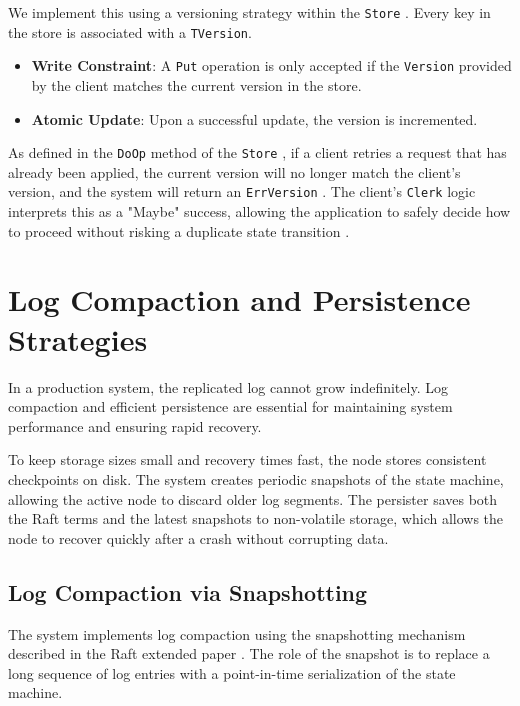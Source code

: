 We implement this using a versioning strategy within the \texttt{Store} \cite{store_go}. Every key in the store is associated with a \texttt{TVersion}.
\begin{itemize}
    \item \textbf{Write Constraint}: A \texttt{Put} operation is only accepted if the \texttt{Version} provided by the client matches the current version in the store.
    \item \textbf{Atomic Update}: Upon a successful update, the version is incremented.
\end{itemize}

As defined in the \texttt{DoOp} method of the \texttt{Store} \cite{store_go}, if a client retries a request that has already been applied, the current version will no longer match the client's version, and the system will return an \texttt{ErrVersion} \cite{api_go}. The client's \texttt{Clerk} logic interprets this as a "Maybe" success, allowing the application to safely decide how to proceed without risking a duplicate state transition \cite{clerk_go}.

\section{Log Compaction and Persistence Strategies}
\label{sec:persistence_strategies}
In a production system, the replicated log cannot grow indefinitely. Log compaction and efficient persistence are essential for maintaining system performance and ensuring rapid recovery.

To keep storage sizes small and recovery times fast, the node stores consistent checkpoints on disk. The system creates periodic snapshots of the state machine, allowing the active node to discard older log segments. The persister saves both the Raft terms and the latest snapshots to non-volatile storage, which allows the node to recover quickly after a crash without corrupting data.

\subsection{Log Compaction via Snapshotting}
The system implements log compaction using the snapshotting mechanism described in the Raft extended paper \cite{RaftExtended}. The role of the snapshot is to replace a long sequence of log entries with a point-in-time serialization of the state machine.


